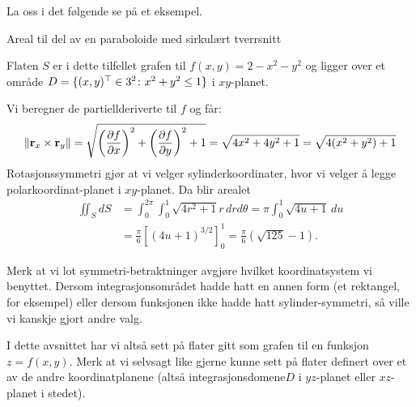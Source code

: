 La oss i det følgende se på et eksempel.
\begin{eks}{Areal til del av en paraboloide med sirkulært tverrsnitt}\mbox{}\\
\begin{minipage}{7cm}
Flaten \( S \) er i dette tilfellet grafen til $f(x,y)=2-x^2-y^2$ og ligger over et område \( D = \{(x,y)^\top\in 3^2 \colon x^2+y^2 \leq 1\}\) i \( xy \)-planet. 
\end{minipage}
\begin{minipage}{5cm}
\end{minipage}

Vi beregner de partiellderiverte til $f$ og får:
\[
\left\| \mathbf{r}_x \times \mathbf{r}_y \right\| = \sqrt{ \left( \frac{\partial f}{\partial x} \right)^2 + \left( \frac{\partial f}{\partial y} \right)^2 + 1 }=\sqrt{4x^2+4y^2+1}=\sqrt{4(x^2+y^2)+1}
\]
Rotasjonssymmetri gjør at vi velger sylinderkoordinater, hvor vi velger å legge polarkoordinat-planet i $xy$-planet. Da blir arealet
\begin{align*}
\iint_S dS &=\int_0^{2\pi}\int_{0}^1 \sqrt{4r^2+1}r\, drd\theta = \pi \int_0^1\sqrt{4u+1}\, du\\ &= \frac{\pi}{6} [(4u+1)^{3/2}]_0^1 =\frac{\pi}{6}(\sqrt{125}-1).
\end{align*}
\end{eks}
Merk at vi lot symmetri-betraktninger avgjøre hvilket koordinatsystem vi benyttet. Dersom integrasjonsområdet hadde hatt en annen form (et rektangel, for eksempel) eller dersom funksjonen ikke hadde hatt sylinder-symmetri, så ville vi kanskje gjort andre valg. 

I dette avsnittet har vi altså sett på flater gitt som grafen til en funksjon $z=f(x,y).$ Merk at vi selvsagt like gjerne kunne sett på flater definert over et av de andre koordinatplanene (altså integrasjonsdomene\( D \) i \( yz \)-planet eller \( xz \)-planet i stedet). 


\FloatBarrier